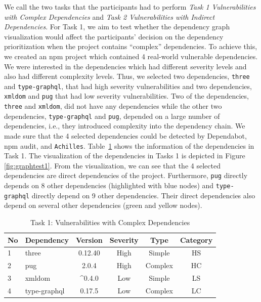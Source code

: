 \documentclass[conference]{IEEEtran}
\newcommand{\FIXME}[1]{{\color{red}\textsf{FIXME: #1}}}
\begin{document}
	We call the two tasks that the participants had to perform \textit{Task 1 Vulnerabilities with Complex Dependencies} and \textit{Task 2 Vulnerabilities with Indirect Dependencies}. For Task 1, we aim to test whether the dependency graph visualization  would affect the participants’ decision on the dependency prioritization when the project contains ``complex'' dependencies. To achieve this, we created an npm project which contained 4 real-world vulnerable dependencies. We were interested in the dependencies which had different severity levels and also had different complexity levels. Thus, we selected two dependencies, \texttt{three} and \texttt{type-graphql}, that had high severity vulnerabilities and two dependencies, \texttt{xmldom} and \texttt{pug} that had low severity vulnerabilities. Two of the dependencies, \texttt{three} and \texttt{xmldom}, did not have any dependencies while the other two dependencies, \texttt{type-graphql} and \texttt{pug}, depended on a large number of dependencies, i.e., they introduced complexity into the dependency chain. 
	We made sure that the 4 selected dependencies could be detected by Dependabot, npm audit, and \texttt{Achilles}. Table~\ref{table:cha-teat1} shows the information of the dependencies in Task 1. The visualization of the dependencies in Tasks 1 is depicted in Figure \ref{fig:graphtest1}. 
	From the visualization, we can see %
	that the 4 selected dependencies are direct dependencies of the project. Furthermore, \texttt{pug} directly depends on 8 other dependencies (highlighted with blue nodes) and \texttt{type-graphql} directly depend on 9 other dependencies. Their direct dependencies also depend on several other dependencies (green and yellow nodes).
	
	\begin{table}[tb]
		\centering
		\caption{Task 1: Vulnerabilities with Complex Dependencies}
		\begin{tabular}{llcccc}
			\toprule
			No & Dependency & Version & Severity & Type & Category \\
			\midrule
			1 & three & 0.12.40 & High & Simple & HS \\
			2 & pug & 2.0.4 & High & Complex &  HC \\
			3 & xmldom & \^{}0.4.0 & Low & Simple & LS \\
			4 & type-graphql & 0.17.5 & Low & Complex & LC \\
			\bottomrule
		\end{tabular}
		\label{table:cha-teat1}
	\end{table}
	
\end{document}

